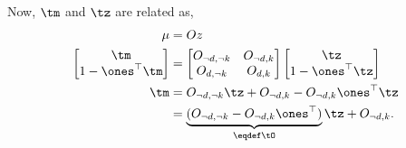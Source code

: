 Now, $\tm$ and $\tz$ are related as,
\begin{align*}
  \mu &= O z \\
  \begin{bmatrix}
    \tm \\
    1 - \ones^\top\tm
  \end{bmatrix} 
  &=
    \begin{bmatrix}
      O_{\neg d,\neg k} & O_{\neg d, k} \\ 
      O_{d,\neg k} & O_{d, k} \\ 
    \end{bmatrix}
    \begin{bmatrix}
      \tz \\
      1 - \ones^\top\tz
    \end{bmatrix} \\
  \tm &= O_{\neg d,\neg k} \tz + O_{\neg d, k} - O_{\neg d, k} \ones^\top \tz \\
      &= \underbrace{(O_{\neg d,\neg k} - O_{\neg d, k} \ones^\top )}_{\eqdef \tO} \tz +  O_{\neg d,k}.
\end{align*}

